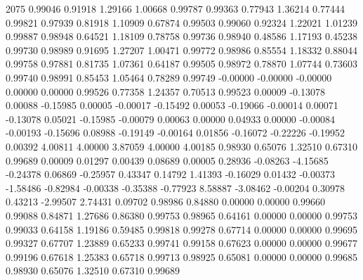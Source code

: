 {2075 0.99046 0.91918 1.29166 1.00668 0.99787 0.99363 0.77943 1.36214 0.77444 0.99821 0.97939 0.81918 1.10909 0.67874 0.99503 0.99060 0.92324 1.22021 1.01239 0.99887 0.98948 0.64521 1.18109 0.78758 0.99736 0.98940 0.48586 1.17193 0.45238 0.99730 0.98989 0.91695 1.27207 1.00471 0.99772 0.98986 0.85554 1.18332 0.88044 0.99758 0.97881 0.81735 1.07361 0.64187 0.99505 0.98972 0.78870 1.07744 0.73603 0.99740 0.98991 0.85453 1.05464 0.78289 0.99749 -0.00000 -0.00000 -0.00000 0.00000 0.00000 0.99526 0.77358 1.24357 0.70513 0.99523 0.00009 -0.13078 0.00088 -0.15985 0.00005 -0.00017 -0.15492 0.00053 -0.19066 -0.00014 0.00071 -0.13078 0.05021 -0.15985 -0.00079 0.00063 0.00000 0.04933 0.00000 -0.00084 -0.00193 -0.15696 0.08988 -0.19149 -0.00164 0.01856 -0.16072 -0.22226 -0.19952 0.00392 4.00811 4.00000 3.87059 4.00000 4.00185 0.98930 0.65076 1.32510 0.67310 0.99689 0.00009 0.01297 0.00439 0.08689 0.00005 0.28936 -0.08263 -4.15685 -0.24378 0.06869 -0.25957 0.43347 0.14792 1.41393 -0.16029 0.01432 -0.00373 -1.58486 -0.82984 -0.00338 -0.35388 -0.77923 8.58887 -3.08462 -0.00204 0.30978 0.43213 -2.99507 2.74431 0.09702 0.98986 0.84880 0.00000 0.00000 0.99660 0.99088 0.84871 1.27686 0.86380 0.99753 0.98965 0.64161 0.00000 0.00000 0.99753 0.99033 0.64158 1.19186 0.59485 0.99818 0.99278 0.67714 0.00000 0.00000 0.99695 0.99327 0.67707 1.23889 0.65233 0.99741 0.99158 0.67623 0.00000 0.00000 0.99677 0.99196 0.67618 1.25383 0.65718 0.99713 0.98925 0.65081 0.00000 0.00000 0.99685 0.98930 0.65076 1.32510 0.67310 0.99689 \\
}\hmacro
